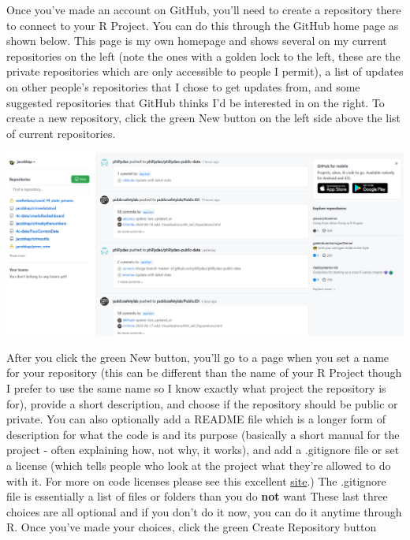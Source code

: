 \documentclass[
  12pt,
]{book}
\begin{document}
Once you've made an account on GitHub, you'll need to create a repository there to connect to your R Project. You can do this through the GitHub home page as shown below. This page is my own homepage and shows several on my current repositories on the left (note the ones with a golden lock to the left, these are the private repositories which are only accessible to people I permit), a list of updates on other people's repositories that I chose to get updates from, and some suggested repositories that GitHub thinks I'd be interested in on the right. To create a new repository, click the green New button on the left side above the list of current repositories.

\includegraphics{images/Github_new_repo.PNG}

After you click the green New button, you'll go to a page when you set a name for your repository (this can be different than the name of your R Project though I prefer to use the same name so I know exactly what project the repository is for), provide a short description, and choose if the repository should be public or private. You can also optionally add a README file which is a longer form of description for what the code is and its purpose (basically a short manual for the project - often explaining how, not why, it works), and add a .gitignore file or set a license (which tells people who look at the project what they're allowed to do with it. For more on code licenses please see this excellent \href{https://choosealicense.com/}{site}.) The .gitignore file is essentially a list of files or folders than you do \textbf{not} want These last three choices are all optional and if you don't do it now, you can do it anytime through R. Once you've made your choices, click the green Create Repository button
\end{document}
